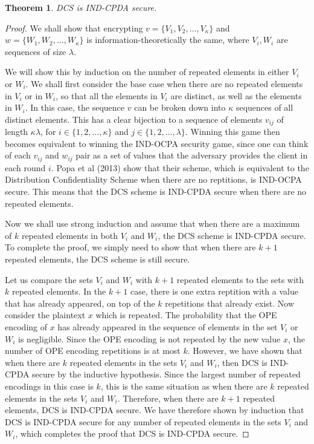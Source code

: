\documentclass[12pt]{article}
\newtheorem{theorem}{Theorem}
\begin{document}
\begin{theorem}
  DCS is IND-CPDA secure. 
\end{theorem}
\begin{proof}
We shall show that encrypting $v = \{V_1, V_2, \ldots, V_{\kappa} \}$ and $w = \{W_1, W_2, \ldots, W_{\kappa}\}$ is information-theoretically the same, where $V_i, W_i$ are sequences of size $\lambda$.

We will show this by induction on the number of repeated elements in either $V_i$ or $W_i$. We shall first consider the base case when there are no repeated elements in $V_i$ or in $W_i$, so that all the elements in $V_i$ are distinct, as well as the elements in $W_i$. In this case, the sequence $v$ can be broken down into $\kappa$ sequences of all distinct elements. This has a clear bijection to a sequence of elements $v_{ij}$ of length $\kappa \lambda$, for $i \in \{1, 2, \ldots, \kappa\}$ and $j \in \{1, 2, \ldots, \lambda \}$. Winning this game then becomes equivalent to winning the IND-OCPA security game, since one can think of each $v_{ij}$ and $w_{ij}$ pair as a set of values that the adversary provides the client in each round $i$. Popa et al (2013) show that their scheme, which is equivalent to the Distribution Confidentiality Scheme when there are no reptitions, is IND-OCPA secure. This means that the DCS scheme is IND-CPDA secure when there are no repeated elements.

Now we shall use strong induction and assume that when there are a maximum of $k$ repeated elements in both $V_i$ and $W_i$, the DCS scheme is IND-CPDA secure. To complete the proof, we simply need to show that when there are $k+1$ repeated elements, the DCS scheme is still secure.

Let us compare the sets $V_i$ and $W_i$ with $k+1$ repeated elements to the sets with $k$ repeated elements. In the $k+1$ case, there is one extra reptition with a value that has already appeared, on top of the $k$ repetitions that already exist. Now consider the plaintext $x$ which is repeated. The probability that the OPE encoding of $x$ has already appeared in the sequence of elements in the set $V_i$ or $W_i$ is negligible. Since the OPE encoding is not repeated by the new value $x$, the number of OPE encoding repetitions is at most $k$. However, we have shown that when there are $k$ repeated elements in the sets $V_i$ and $W_i$, then DCS is IND-CPDA secure by the inductive hypothesis. Since the largest number of repeated encodings in this case is $k$, this is the same situation as when there are $k$ repeated elements in the sets $V_i$ and $W_i$. Therefore, when there are $k+1$ repeated elements, DCS is IND-CPDA secure.
We have therefore shown by induction that DCS is IND-CPDA secure for any number of repeated elements in the sets $V_i$ and $W_i$, which completes the proof that DCS is IND-CPDA secure.
\end{proof}
\end{document}
